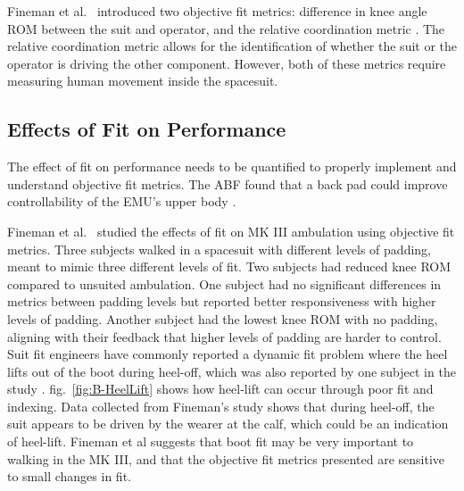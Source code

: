 \documentclass[defaultstyle,11pt]{comps}
\begin{document}
Fineman et al.~\citep{Fineman2018} introduced two objective fit metrics: difference in knee angle ROM between the suit and operator, and the relative coordination metric \citep{Fineman2017a}.
The relative coordination metric allows for the identification of whether the suit or the operator is driving the other component.
However, both of these metrics require measuring human movement inside the spacesuit.

\hypertarget{effects-of-fit-on-performance}{%
\subsection{Effects of Fit on Performance}\label{effects-of-fit-on-performance}}

The effect of fit on performance needs to be quantified to properly implement and understand objective fit metrics.
The ABF found that a back pad could improve controllability of the EMU's upper body \citep{Chappell2017}.

Fineman et al.~\citep{Fineman2018} studied the effects of fit on MK III ambulation using objective fit metrics.
Three subjects walked in a spacesuit with different levels of padding, meant to mimic three different levels of fit.
Two subjects had reduced knee ROM compared to unsuited ambulation.
One subject had no significant differences in metrics between padding levels but reported better responsiveness with higher levels of padding.
Another subject had the lowest knee ROM with no padding, aligning with their feedback that higher levels of padding are harder to control.
Suit fit engineers have commonly reported a dynamic fit problem where the heel lifts out of the boot during heel-off, which was also reported by one subject in the study \citep{Fineman2018}.
fig.~\ref{fig:B-HeelLift} shows how heel-lift can occur through poor fit and indexing. Data collected from Fineman's study shows that during heel-off, the suit appears to be driven by the wearer at the calf, which could be an indication of heel-lift. Fineman et al \citep{Fineman2018} suggests that boot fit may be very important to walking in the MK III, and that the objective fit metrics presented are sensitive to small changes in fit.
\end{document}
